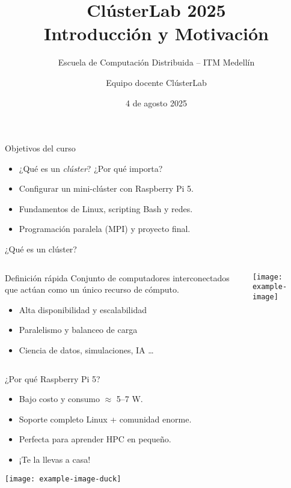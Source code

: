 \documentclass[aspectratio=169, professionalfonts]{beamer}
\title[ClústerLab • Día 1]{ClústerLab 2025\\\huge Introducción y Motivación}
\subtitle{Escuela de Computación Distribuida – ITM Medellín}
\author{Equipo docente ClústerLab}
\date{4 de agosto 2025}
\begin{document}
\begin{frame}[plain]
  \titlepage
\end{frame}

\begin{frame}{Objetivos del curso}
  \begin{itemize}
    \item ¿Qué es un \emph{clúster}? ¿Por qué importa?
    \item Configurar un mini-clúster con Raspberry Pi 5.
    \item Fundamentos de Linux, scripting Bash y redes.
    \item Programación paralela (MPI) y proyecto final.
  \end{itemize}
\end{frame}

\begin{frame}{¿Qué es un clúster?}
  \begin{columns}[T]
    \begin{column}{0.55\textwidth}
      \begin{block}{Definición rápida}
        Conjunto de computadores interconectados que actúan
        como un único recurso de cómputo.
      \end{block}
      \pause
      \begin{itemize}
        \item Alta disponibilidad y escalabilidad 
        \item Paralelismo y balanceo de carga
        \item Ciencia de datos, simulaciones, IA …
      \end{itemize}
    \end{column}
    \begin{column}{0.4\textwidth}
      \centering
      \texttt{[image: example-image]} %
    \end{column}
  \end{columns}
\end{frame}

\begin{frame}{¿Por qué Raspberry Pi 5?}
  \begin{itemize}
    \item Bajo costo y consumo $\approx$ 5–7 W.
    \item Soporte completo Linux + comunidad enorme.
    \item Perfecta para aprender HPC en pequeño.
    \item ¡Te la llevas a casa! 
  \end{itemize}
  \vspace{0.4em}
  \centering
  \texttt{[image: example-image-duck]} %
\end{frame}
\end{document}

